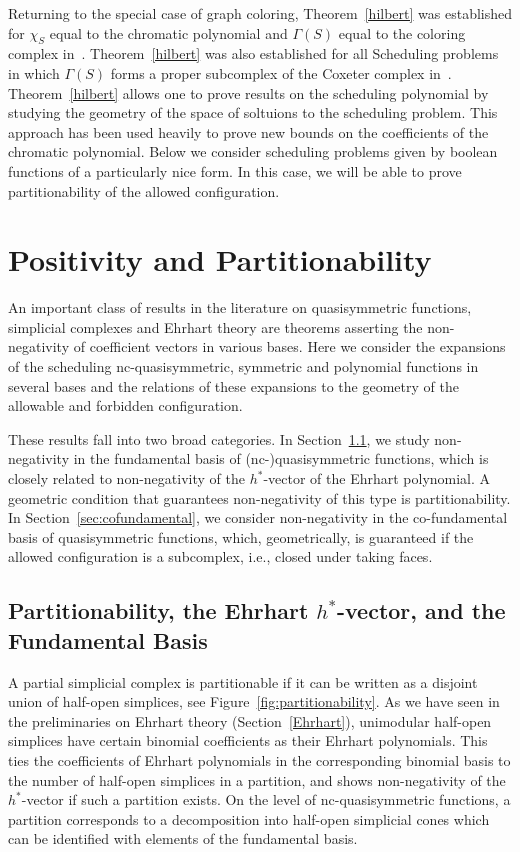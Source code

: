 \documentclass[12pt,reqno]{amsart}
\numberwithin{definition}{section}
\theoremstyle{definition}
\newcommand{\forb}{\Gamma} %
\begin{document}
Returning to the special case of graph coloring, Theorem~\ref{hilbert}
was established for $\chi_S$ equal to the chromatic polynomial and
$\forb(S)$ equal to the coloring complex in~\cite{Ein}.
Theorem~\ref{hilbert} was also established for all Scheduling problems
in which $\forb(S)$ forms a proper subcomplex of the Coxeter complex
in~\cite{ABK}.  Theorem~\ref{hilbert} allows one to prove results on
the scheduling polynomial by studying the geometry of the space of
soltuions to the scheduling problem.  This approach has been used
heavily to prove new bounds on the coefficients of the chromatic
polynomial.   Below we consider scheduling problems given by boolean functions
of a particularly nice form.  In this case, we will be able to prove partitionability of the allowed configuration.



\section{Positivity and Partitionability}
\label{geometry}

An important class of results in the literature on quasisymmetric
functions, simplicial complexes and Ehrhart theory are theorems
asserting the non-negativity of coefficient vectors in various bases.
Here we consider the expansions of the scheduling nc-quasisymmetric,
symmetric and polynomial functions in several bases and the relations
of these expansions to the geometry of the allowable and forbidden configuration.  

These results fall into two broad categories. In Section~\ref{sec:partitionability}, we study non-negativity in the fundamental basis of (nc-)quasisymmetric functions, which is closely related to non-negativity of the $h^*$-vector of the Ehrhart polynomial. A geometric condition that guarantees non-negativity of this type is partitionability. In Section~\ref{sec:cofundamental}, we consider non-negativity in the co-fundamental basis of quasisymmetric functions, which, geometrically, is guaranteed if the allowed configuration is a subcomplex, i.e., closed under taking faces.

\subsection{Partitionability, the Ehrhart $h^*$-vector, and the Fundamental Basis}
\label{sec:partitionability}

A partial simplicial complex is partitionable if it can be written as a disjoint union of half-open simplices, see Figure~\ref{fig:partitionability}. As we have seen in the preliminaries on Ehrhart theory (Section~\ref{Ehrhart}), unimodular half-open simplices have certain binomial coefficients as their Ehrhart polynomials. This ties the coefficients of Ehrhart polynomials in the corresponding binomial basis to the number of half-open simplices in a partition, and shows non-negativity of the $h^*$-vector if such a partition exists. On the level of nc-quasisymmetric functions, a partition corresponds to a decomposition into half-open simplicial cones which can be identified with elements of the fundamental basis.
\end{document}
